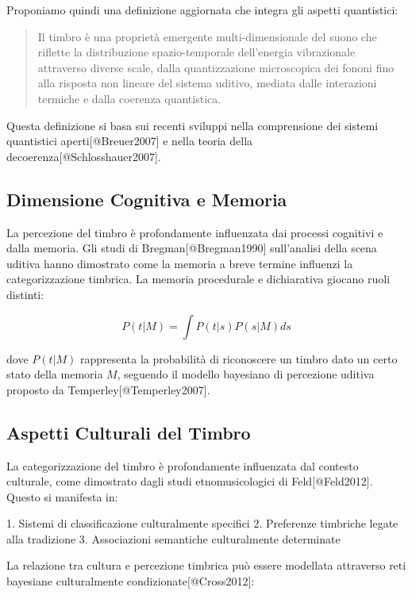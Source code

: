 \documentclass{gs-adonis}
\begin{document}
Proponiamo quindi una definizione aggiornata che integra gli aspetti
quantistici:

\begin{quote}
Il timbro è una proprietà emergente multi-dimensionale del suono che
riflette la distribuzione spazio-temporale dell'energia vibrazionale
attraverso diverse scale, dalla quantizzazione microscopica dei fononi
fino alla risposta non lineare del sistema uditivo, mediata dalle
interazioni termiche e dalla coerenza quantistica.
\end{quote}

Questa definizione si basa sui recenti sviluppi nella comprensione dei
sistemi quantistici aperti{[}@Breuer2007{]} e nella teoria della
decoerenza{[}@Schlosshauer2007{]}.

\subsection{Dimensione Cognitiva e
Memoria}\label{dimensione-cognitiva-e-memoria}

La percezione del timbro è profondamente influenzata dai processi
cognitivi e dalla memoria. Gli studi di Bregman{[}@Bregman1990{]}
sull'analisi della scena uditiva hanno dimostrato come la memoria a
breve termine influenzi la categorizzazione timbrica. La memoria
procedurale e dichiarativa giocano ruoli distinti:

\[P(t|M) = \int P(t|s)P(s|M)ds\]

dove \(P(t|M)\) rappresenta la probabilità di riconoscere un timbro dato
un certo stato della memoria \(M\), seguendo il modello bayesiano di
percezione uditiva proposto da Temperley{[}@Temperley2007{]}.

\subsection{Aspetti Culturali del
Timbro}\label{aspetti-culturali-del-timbro}

La categorizzazione del timbro è profondamente influenzata dal contesto
culturale, come dimostrato dagli studi etnomusicologici di
Feld{[}@Feld2012{]}. Questo si manifesta in:

1. Sistemi di classificazione culturalmente specifici 2. Preferenze
timbriche legate alla tradizione 3. Associazioni semantiche
culturalmente determinate

La relazione tra cultura e percezione timbrica può essere modellata
attraverso reti bayesiane culturalmente condizionate{[}@Cross2012{]}:
\end{document}
